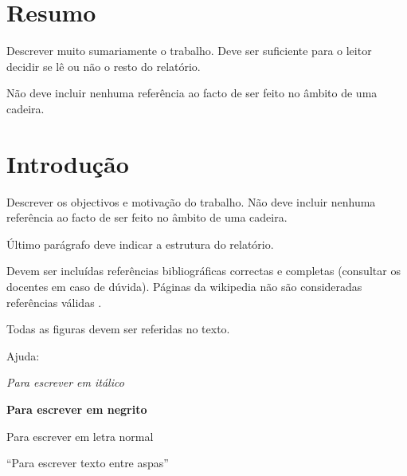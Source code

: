 \documentclass[15pt,a4paper]{article}
\begin{document}
\newpage

\section*{Resumo}
Descrever muito sumariamente o trabalho. Deve ser suficiente para o leitor decidir se lê ou não o resto do relatório.

Não deve incluir nenhuma referência ao facto de ser feito no âmbito de uma cadeira.



\section{Introdução}
Descrever os objectivos e motivação do trabalho. Não deve incluir nenhuma referência ao facto de ser feito no âmbito de uma cadeira.

Último parágrafo deve indicar a estrutura do relatório.

Devem ser incluídas referências bibliográficas correctas e completas (consultar os docentes em caso de dúvida). Páginas da wikipedia não são consideradas referências válidas \cite{CodigoSite, CodigoLivro}.

Todas as figuras devem ser referidas no texto. %



Ajuda:

\textit{Para escrever em itálico}

\textbf{Para escrever em negrito}

Para escrever em letra normal

``Para escrever texto entre aspas''
\end{document}
